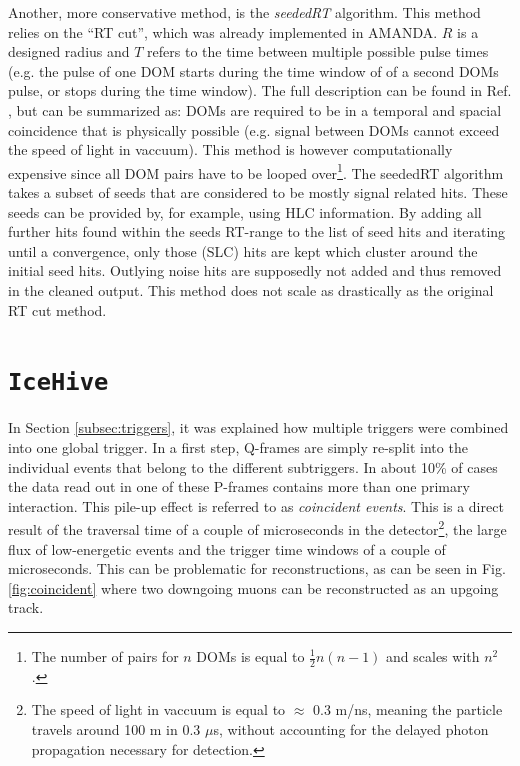 Another, more conservative method, is the \textit{seededRT}  algorithm. This method relies on the ``RT cut'', which was already implemented in AMANDA. $R$ is a designed radius and $T$ refers to the time between multiple possible pulse times (e.g. the pulse of one DOM starts during the time window of of a second DOMs pulse, or stops during the time window). The full description can be found in Ref. \cite{RTcutwiki}, but can be summarized as: DOMs are required to be in a temporal and spacial coincidence that is physically possible (e.g. signal between DOMs cannot exceed the speed of light in vaccuum). This method is however computationally expensive since all DOM pairs have to be looped over\footnote{The number of pairs for $n$ DOMs is equal to $\frac{1}{2}n(n-1)$ and scales with $n^2$.}. The seededRT algorithm takes a subset of seeds that are considered to be mostly signal related hits. These seeds can be provided by, for example, using HLC information. By adding all further hits found within the seeds RT-range to the list of seed hits and iterating until a convergence, only those (SLC) hits are kept which cluster around the initial seed hits. Outlying noise hits are supposedly not added and thus removed in the cleaned output. This method does not scale as drastically as the original RT cut method.


\section{\texttt{IceHive}}
In Section \ref{subsec:triggers}, it was explained how multiple triggers were combined into one global trigger. In a first step, Q-frames are simply re-split into the individual events that belong to the different subtriggers. In about 10\% of cases the data read out in one of these P-frames contains more than one primary interaction. This pile-up effect is referred to as \textit{coincident events}. This is a direct result of the traversal time of a couple of microseconds in the detector\footnote{The speed of light in vaccuum is equal to $\approx$ 0.3 m/ns, meaning the particle travels around 100 m in 0.3 $\mu$s, without accounting for the delayed photon propagation necessary for detection.}, the large flux of low-energetic events and the trigger time windows of a couple of microseconds. This can be problematic for reconstructions, as can be seen in Fig. \ref{fig:coincident} where two downgoing muons can be reconstructed as an upgoing track.\\

